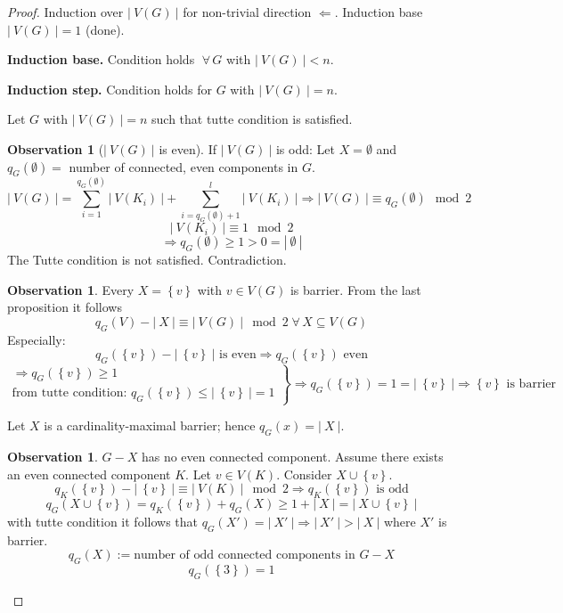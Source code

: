 \documentclass[a4paper]{article}
\theoremstyle{definition}
\newtheorem{observation}[theorem]{Observation}
\newcommand{\card}[1]{\left|\:\!#1\:\!\right|}
\newcommand{\set}[1]{\left\{#1\right\}}
\newcommand{\fall}{\;\forall\,}
\begin{document}
\begin{proof}
  Induction over $\card{V(G)}$ for non-trivial direction $\Leftarrow$.
  Induction base $\card{V(G)} = 1$ (done).

  \textbf{Induction base.}
    Condition holds $\fall G$ with $\card{V(G)} < n$.

  \textbf{Induction step.}
    Condition holds for $G$ with $\card{V(G)} = n$.

  Let $G$ with $\card{V(G)} = n$ such that tutte condition is satisfied.

  \begin{observation}[$\card{V(G)}$ is even]
    If $\card{V(G)}$ is odd:
    Let $X = \emptyset$ and $q_G(\emptyset) =$ number of connected, even components in $G$.
    \[
      \card{V(G)} = \sum_{i=1}^{q_G(\emptyset)} \card{V(K_i)}
        + \sum_{i=q_G(\emptyset)+1}^l \card{V(K_i)}
        \Rightarrow \card{V(G)} \equiv q_G(\emptyset) \mod{2}
    \] \[
      \card{V(K_i)} \equiv 1 \mod{2}
    \] \[
      \Rightarrow q_G(\emptyset) \geq 1 > 0 = \card{\emptyset}
    \]
    The Tutte condition is not satisfied. Contradiction.
  \end{observation}

  \begin{observation}
    Every $X = \set{v}$ with $v \in V(G)$ is barrier.
    From the last proposition it follows
    \[ q_G(V) - \card{X} \equiv \card{V(G)} \mod{2} \fall X \subseteq V(G) \]
    Especially:
    \[ q_G(\set{v}) - \card{\set{v}} \text{ is even} \Rightarrow q_G(\set{v}) \text{ even} \]
    \[
      \left.\begin{array}{c}
        \Rightarrow q_G(\set{v}) \geq 1 \\
        \text{from tutte condition: } q_G(\set{v}) \leq \card{\set{v}} = 1
      \end{array}\right\}
      \Rightarrow q_G(\set{v}) = 1 = \card{\set{v}} \Rightarrow \set{v} \text{ is barrier}
    \]
  \end{observation}

  Let $X$ is a cardinality-maximal barrier; hence $q_G(x) = \card{X}$.

  \begin{observation}
    $G-X$ has no even connected component.
    Assume there exists an even connected component $K$. Let $v \in V(K)$. Consider $X \cup \set{v}$.
    \[
      q_K(\set{v}) - \card{\set{v}} \equiv \card{V(K)} \mod{2}
      \Rightarrow q_K(\set{v}) \text{ is odd}
    \] \[
      q_G(X \cup \set{v}) = q_K(\set{v}) + q_G(X) \geq 1 + \card{X} = \card{X \cup \set{v}}
    \]
    with tutte condition it follows that $q_G(X') = \card{X'} \Rightarrow \card{X'} > \card{X}$
    where $X'$ is barrier.
    \[ q_G(X) := \text{number of odd connected components in $G-X$} \]
    \[ q_G(\set{3}) = 1 \]


\end{observation}
\end{proof}
\end{document}
